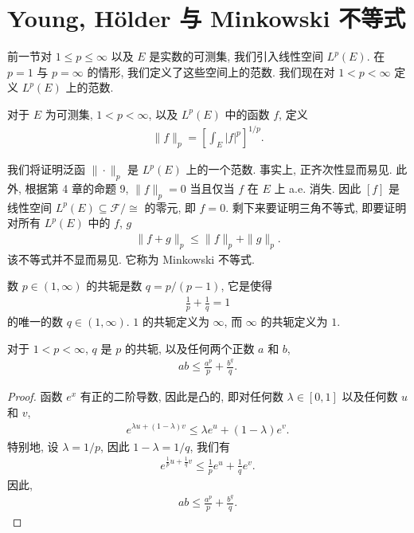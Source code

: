 \documentclass[../../main.tex]{subfiles}
\begin{document}
\section{Young, H\"older 与 Minkowski 不等式}\label{section:ch07-Young-Holder-Minkowski}

前一节对 $1\leqslant p\leqslant\infty$ 以及 $E$ 是实数的可测集, 我们引入线性空间 $L^{p}(E)$. 在 $p=1$ 与 $p=\infty$ 的情形, 我们定义了这些空间上的范数. 我们现在对 $1<p<\infty$ 定义 $L^{p}(E)$ 上的范数.

\begin{definition}[$L^{p}$ 范数]\label{definition:ch07-Lp范数}
对于 $E$ 为可测集, $1<p<\infty$, 以及 $L^{p}(E)$ 中的函数 $f$, 定义
\begin{align*}
\|f\|_{p}=\left[\int_{E}|f|^{p}\right]^{1/p}.
\end{align*}
\end{definition}

我们将证明泛函 $\|\cdot\|_{p}$ 是 $L^{p}(E)$ 上的一个范数. 事实上, 正齐次性显而易见. 此外, 根据第 4 章的命题 9, $\|f\|_{p}=0$ 当且仅当 $f$ 在 $E$ 上 a.e. 消失. 因此 $[f]$ 是线性空间 $L^{p}(E)\subseteq\mathcal{F}/\cong$ 的零元, 即 $f=0$. 剩下来要证明三角不等式, 即要证明对所有 $L^{p}(E)$ 中的 $f$, $g$
\begin{align*}
\|f+g\|_{p}\leqslant\|f\|_{p}+\|g\|_{p}.
\end{align*}
该不等式并不显而易见. 它称为 Minkowski 不等式.

\begin{definition}[共轭数]\label{definition:ch07-共轭数}
数 $p\in(1,\infty)$ 的共轭是数 $q=p/(p-1)$, 它是使得
\begin{align*}
\frac{1}{p}+\frac{1}{q}=1
\end{align*}
的唯一的数 $q\in(1,\infty)$. $1$ 的共轭定义为 $\infty$, 而 $\infty$ 的共轭定义为 $1$.
\end{definition}

\begin{proposition}\label{proposition:ch07-Young}
对于 $1<p<\infty$, $q$ 是 $p$ 的共轭, 以及任何两个正数 $a$ 和 $b$,
\begin{align*}
ab\leqslant\frac{a^{p}}{p}+\frac{b^{q}}{q}.
\end{align*}
\end{proposition}

\begin{proof}
函数 $e^{x}$ 有正的二阶导数, 因此是凸的, 即对任何数 $\lambda\in[0,1]$ 以及任何数 $u$ 和 $v$,
\begin{align*}
e^{\lambda u+(1-\lambda)v}\leqslant\lambda e^{u}+(1-\lambda)e^{v}.
\end{align*}
特别地, 设 $\lambda=1/p$, 因此 $1-\lambda=1/q$, 我们有
\begin{align*}
e^{\frac{1}{p}u+\frac{1}{q}v}\leqslant\frac{1}{p}e^{u}+\frac{1}{q}e^{v}.
\end{align*}
因此,
\begin{align*}
ab\leqslant\frac{a^{p}}{p}+\frac{b^{q}}{q}.
\end{align*}
\end{proof}
\end{document}
